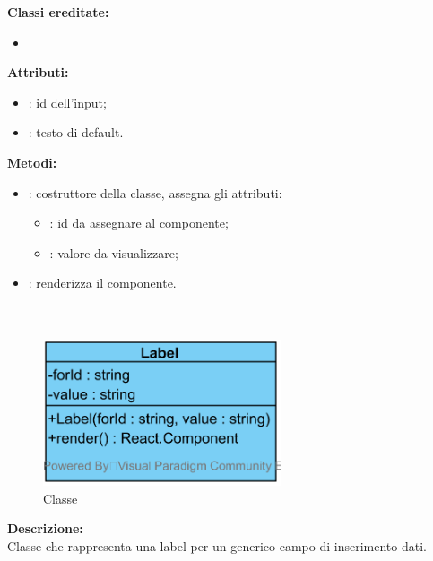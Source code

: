 \textbf{Classi ereditate:}
\begin{itemize}
	\item {}
\end{itemize}


\textbf{Attributi:}
\begin{itemize}
	\item {}: id dell'input;
	\item {}: testo di default.
\end{itemize}

\textbf{Metodi:}
\begin{itemize}
	\item {}: costruttore della classe, assegna gli attributi:
	\begin{itemize}
		\item {}: id da assegnare al componente;
		\item {}: valore da visualizzare;
	\end{itemize}
	\item {}: renderizza il componente.
\end{itemize}

\paragraph[::Label]{\class}\mbox{}\\ \label{\class}
\begin{figure}[H]
	\centering
	\includegraphics[width=7cm]{./diagrammi/framework/view/gui/label.png}
	\caption{Classe \class}
\end{figure}
\textbf{Descrizione:}\\
Classe che rappresenta una label per un generico campo di inserimento dati.

